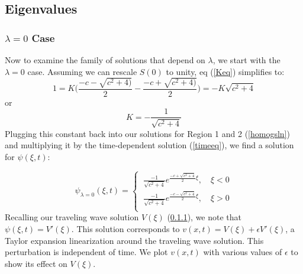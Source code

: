 \documentclass[12pt]{article}
\begin{document}
\subsection{Eigenvalues}
\subsubsection{$\lambda = 0$ Case}
Now to examine the family of solutions that depend on $\lambda$, we start with the $\lambda = 0$ case. Assuming we can rescale $S(0)$ to unity, eq (\ref{Keq}) simplifies to:
$$1 = K\Bigg(\frac{-c-\sqrt{c^2+4)}}{2} - \frac{-c+\sqrt{c^2+4)}}{2}\Bigg) = -K\sqrt{c^2+4} $$
or
$$K = -\frac{1}{\sqrt{c^2+4}}$$
Plugging this constant back into our solutions for Region 1 and 2 (\ref{homogsln}) and multiplying it by the time-dependent solution (\ref{timeeq}), we find a solution for $\psi(\xi,t)$:

\begin{equation}\label{solnlambda0}
\psi_{\lambda=0}(\xi,t)=
\begin{cases}
\ \frac{-1}{\sqrt{c^2+4}}e^{\frac{-c+\sqrt{c^2+4}}{2}\xi},\quad \xi < 0 \\
\ \frac{-1}{\sqrt{c^2+4}}e^{\frac{-c-\sqrt{c^2+4}}{2}\xi},\quad \xi > 0\\
\end{cases}
\end{equation}
Recalling our traveling wave solution $V(\xi)$ (\ref{}), we note that $\psi(\xi,t) = V'(\xi)$. This solution corresponds to $v(x,t) = V(\xi) + \epsilon V'(\xi)$, a Taylor expansion linearization around the traveling wave solution. This perturbation is independent of time. We plot $v(x,t)$ with various values of $\epsilon$ to show its effect on $V(\xi)$.
\end{document}
